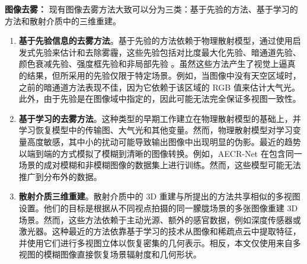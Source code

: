 \textbf{图像去雾：}
现有图像去雾方法大致可以分为三类：基于先验的方法、基于学习的方法和散射介质中的三维重建。
\begin{enumerate}
    \item \textbf{基于先验信息的去雾方法}。基于先验的方法依赖于物理散射模型，通过使用启发式先验来估计和去除雾霾，这些先验包括对比度最大化先验、暗通道先验、颜色衰减先验、强度框先验和非局部先验 \cite{kaiming_he_single_2009, nishino_bayesian_2012, fattal_dehazing_2014, wu_contrastive_2021}。虽然这些方法产生了视觉上逼真的结果，但所采用的先验仅限于特定场景。例如，当图像中没有天空区域时，之前的暗通道方法表现不佳\cite{kaiming_he_single_2009}，因为它依赖于该区域的 RGB 值来估计大气光。此外，由于先验是在图像域中指定的，因此可能无法完全保证多视图一致性。
    \item \textbf{基于学习的去雾方法}。这种类型的早期工作\cite{cai_dehazenet_2016, fujimura_dehazing_2021, dong_multi-scale_2020, li_aod-net_2017, liu_griddehazenet_2019, qin_ffa-net_2020, qu_enhanced_2019, ren_gated_2018, ren_single_2020, zhang_densely_2018}建立在物理散射模型的基础上，并学习恢复模型中的传输图、大气光和其他变量。然而，物理散射模型对学习变量高度敏感，其中小的扰动可能导致输出图像中出现明显的伪影。最近的趋势\cite{song_vision_2022, liu_griddehazenet_2019, chen_gated_2019, dong_multi-scale_2020, qin_ffa-net_2020, wu_contrastive_2021, wang_eaa-net_2021} 以端到端的方式模拟了模糊到清晰的图像转换。例如，AECR-Net \cite{wu_contrastive_2021} 在包含同一场景的成对模糊和非模糊图像的数据集上进行训练。然而，这些模型可能无法推广到分布外的数据。
    \item \textbf{散射介质三维重建}。散射介质中的 3D 重建与所提出的方法共享相似的多视图设置。他们的目标是根据从不同视点拍摄的同一朦胧场景的多张图像重建 3D 场景。然而，这些方法依赖于主动光源\cite{murez_photometric_2017, narasimhan_structured_2005, fujimura_photometric_2018, tsiotsios_backscatter_2014}、额外的感官数据，例如深度传感器或激光器\cite{caraffa_stereo_2013, li_simultaneous_2015, heide_imaging_2014, satat_towards_2018, wang_programmable_2018}。这种最近的方法\cite{fujimura_dehazing_2021, caraffa_stereo_2013, song_deep_2019, li_simultaneous_2015}依靠基于学习的技术从图像和稀疏点云中提取特征，并使用它们进行多视图立体以恢复密集的几何表示。相反，本文仅使用来自多视图的模糊图像直接恢复场景辐射度和几何形状。
\end{enumerate}

